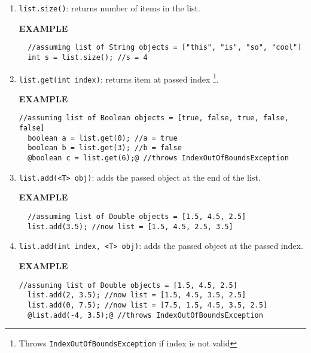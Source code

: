 \begin{enumerate}
  \item \texttt{list.size()}: returns number of items in the list.
  
  \begin{center} \textbf{EXAMPLE} \end{center}
  \begin{lstlisting}
  //assuming list of String objects = ["this", "is", "so", "cool"]
  int s = list.size(); //s = 4
  \end{lstlisting}

  \item \texttt{list.get(int index)}: returns item at passed index \footnote{\label{ioobe}Throws \texttt{IndexOutOfBoundsException} if index is not valid}.

    \begin{center} \textbf{EXAMPLE} \end{center}
  \begin{lstlisting}[style=buggy]
  //assuming list of Boolean objects = [true, false, true, false, false]
  boolean a = list.get(0); //a = true
  boolean b = list.get(3); //b = false
  @boolean c = list.get(6);@ //throws IndexOutOfBoundsException
  \end{lstlisting}
  
  \item \texttt{list.add(<T> obj)}: adds the passed object at the end of the list.

    \begin{center} \textbf{EXAMPLE} \end{center}
  \begin{lstlisting}
  //assuming list of Double objects = [1.5, 4.5, 2.5]
  list.add(3.5); //now list = [1.5, 4.5, 2.5, 3.5]
  \end{lstlisting}
  
  \item \texttt{list.add(int index, <T> obj)}:  adds the passed object at the passed index.   

    \begin{center} \textbf{EXAMPLE} \end{center}
  \begin{lstlisting}[style=buggy]
  //assuming list of Double objects = [1.5, 4.5, 2.5]
  list.add(2, 3.5); //now list = [1.5, 4.5, 3.5, 2.5]
  list.add(0, 7.5); //now list = [7.5, 1.5, 4.5, 3.5, 2.5]
  @list.add(-4, 3.5);@ //throws IndexOutOfBoundsException
  \end{lstlisting}
  

\end{enumerate}
